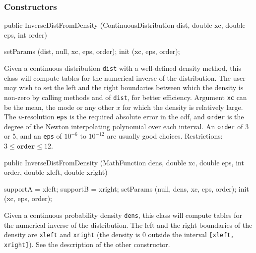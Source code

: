 \subsubsection* {Constructors}
\begin{code}

   public InverseDistFromDensity (ContinuousDistribution dist, double xc,
                                  double eps, int order) \begin{hide} {
      setParams (dist, null, xc, eps, order);
      init (xc, eps, order);
   } \end{hide}
\end{code}
\begin{tabb} Given a continuous distribution \texttt{dist} with a well-defined
density method, this class will compute tables for the numerical inverse of
the distribution. The user may wish to set the left and the right boundaries
 between which the density is non-zero by calling methods
and
of \texttt{dist}, for better efficiency.
Argument \texttt{xc} can be the mean,
the mode or any other $x$ for which the density is relatively large.
The $u$-resolution \texttt{eps} is the required absolute error in the cdf,
and \texttt{order} is the degree of the
Newton interpolating polynomial over each interval.
An \texttt{order} of 3 or 5, and an \texttt{eps} of $10^{-6}$ to $10^{-12}$
are usually good choices.
 Restrictions: $3 \le \texttt{order} \le 12$.
\end{tabb}
\begin{code}

   public InverseDistFromDensity (MathFunction dens, double xc, double eps,
                                  int order, double xleft, double xright) \begin{hide} {
      supportA = xleft;
      supportB = xright;
      setParams (null, dens, xc, eps, order);
      init (xc, eps, order);
   } \end{hide}
\end{code}
\begin{tabb} Given a continuous probability density \texttt{dens},
this class will compute tables for the numerical inverse of
the distribution. The left and the right boundaries of the density are
\texttt{xleft} and \texttt{xright} (the density is 0 outside the
interval \texttt{[xleft, xright]}).
See the description of the other constructor.
\end{tabb}


